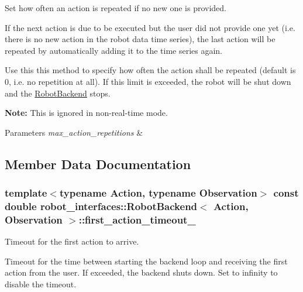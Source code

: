 Set how often an action is repeated if no new one is provided. 

If the next action is due to be executed but the user did not provide one yet (i.\+e. there is no new action in the robot data time series), the last action will be repeated by automatically adding it to the time series again.

Use this this method to specify how often the action shall be repeated (default is 0, i.\+e. no repetition at all). If this limit is exceeded, the robot will be shut down and the \hyperlink{classrobot__interfaces_1_1RobotBackend}{Robot\+Backend} stops.

{\bfseries Note\+:} This is ignored in non-\/real-\/time mode.


\begin{DoxyParams}{Parameters}
{\em max\+\_\+action\+\_\+repetitions} & \\
\hline
\end{DoxyParams}


\subsection{Member Data Documentation}
\subsubsection[{\texorpdfstring{first\+\_\+action\+\_\+timeout\+\_\+}{first_action_timeout_}}]{\setlength{\rightskip}{0pt plus 5cm}template$<$typename Action, typename Observation$>$ const double {\bf robot\+\_\+interfaces\+::\+Robot\+Backend}$<$ {\bf Action}, {\bf Observation} $>$\+::first\+\_\+action\+\_\+timeout\+\_\+\hspace{0.3cm}{\ttfamily [private]}}\hypertarget{classrobot__interfaces_1_1RobotBackend_a56f111a9e0663eedefbaf55de36f7cac}{}\label{classrobot__interfaces_1_1RobotBackend_a56f111a9e0663eedefbaf55de36f7cac}


Timeout for the first action to arrive. 

Timeout for the time between starting the backend loop and receiving the first action from the user. If exceeded, the backend shuts down. Set to infinity to disable the timeout. 
